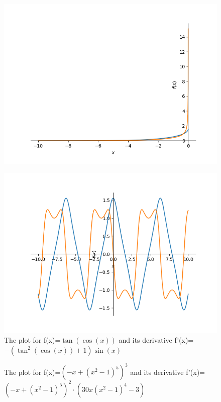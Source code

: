 \documentclass{article}
\begin{document}
\begin{figure}
\includegraphics{plot_34}
\end{figure}\begin{figure}
\caption{The plot for f(x)=$\tan{\left(\cos{\left(x \right)} \right)}$ and its derivative f'(x)=$- \left(\tan^{2}{\left(\cos{\left(x \right)} \right)} + 1\right) \sin{\left(x \right)}$}
\centering
\includegraphics{plot_35}
\end{figure}\begin{figure}
\caption{The plot for f(x)=$\left(- x + \left(x^{2} - 1\right)^{5}\right)^{3}$ and its derivative f'(x)=$\left(- x + \left(x^{2} - 1\right)^{5}\right)^{2} \cdot \left(30 x \left(x^{2} - 1\right)^{4} - 3\right)$}
\centering

\end{figure}
\end{document}
